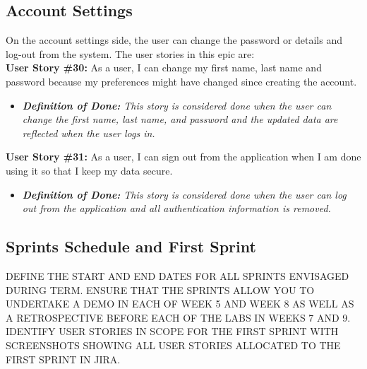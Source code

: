 \subsection{Account Settings}
    \label{subsec:account_settings}

On the account settings side, the user can change the password or details and log-out from the system. The user stories in this epic are:\\

\noindent \textbf{User Story \#30:} As a user, I can change my first name, last name and password because my preferences might have changed since creating the account.
\begin{itemize}
	\item \textit{\textbf{Definition of Done:} This story is considered done when the user can change the first name, last name, and password and the updated data are reflected when the user logs in.} 
\end{itemize}

\noindent \textbf{User Story \#31:} As a user, I can sign out from the application when I am done using it so that I keep my data secure.
\begin{itemize}
	\item \textit{\textbf{Definition of Done:} This story is considered done when the user can log out from the application and all authentication information is removed.} 
\end{itemize}

\subsection{Sprints Schedule and First Sprint}
    \label{subsec:sprint_schedule}

{\color{red} DEFINE THE START AND END DATES FOR ALL SPRINTS ENVISAGED DURING TERM. ENSURE THAT THE SPRINTS ALLOW YOU TO UNDERTAKE A DEMO IN EACH OF WEEK 5 AND WEEK 8 AS WELL AS A RETROSPECTIVE BEFORE EACH OF THE LABS IN WEEKS 7 AND 9.\\
	
\noindent IDENTIFY USER STORIES IN SCOPE FOR THE FIRST SPRINT WITH SCREENSHOTS SHOWING ALL USER STORIES ALLOCATED TO THE FIRST SPRINT IN JIRA.}

\newpage

\begin{landscape}

\end{landscape}

\newpage